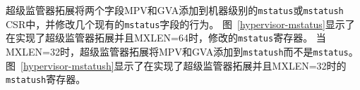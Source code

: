 超级监管器拓展将两个字段MPV和GVA添加到机器级别的{\tt mstatus}或{\tt mstatush} CSR中，并修改几个现有的{\tt mstatus}字段的行为。
图~\ref{hypervisor-mstatus}显示了在实现了超级监管器拓展并且MXLEN=64时，修改的{\tt mstatus}寄存器。
当MXLEN=32时，超级监管器拓展将MPV和GVA添加到{\tt mstatush}而不是{\tt mstatus}。
图~\ref{hypervisor-mstatush}显示了在实现了超级监管器拓展并且MXLEN=32时的{\tt mstatush}寄存器。

